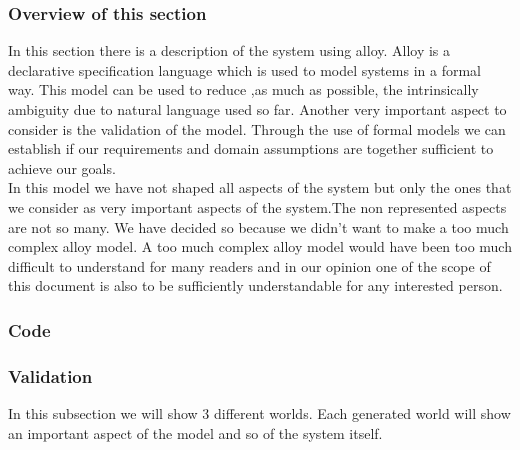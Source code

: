 \documentclass[titlepage]{article}
\begin{document}
\subsubsection{Overview of this section}
In this section there is a description of the system using alloy. Alloy is a declarative specification language which is used to model systems in a formal way. This model can be used to reduce ,as much as possible, the intrinsically ambiguity due to natural language used so far.
Another very important aspect to consider is the validation of the model. Through the use of formal models we can establish if our requirements and domain assumptions are together sufficient to achieve our goals.\\
In this model we have not shaped all aspects of the system but only the ones that we consider as very important aspects of the system.The non represented aspects are not so many. We have decided so because we didn't want to make a too much complex alloy model. A too much complex alloy model would have been too much difficult to understand for many readers and in our opinion one of the scope of this document is also to be sufficiently understandable for any interested person.

\subsubsection{Code}

\subsubsection{Validation}
In this subsection we will show 3 different worlds. Each generated world will show an important aspect of the model and so of the system itself.
\end{document}

